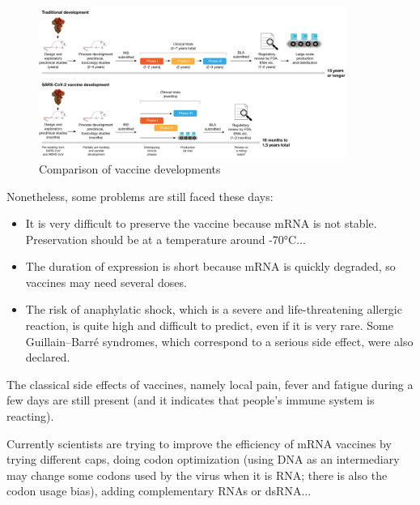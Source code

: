 \documentclass{article}
\begin{document}
            \begin{figure}
                \centering
                \includegraphics[width=0.9\textwidth]{imgs/CovidDev.png}
                \caption{Comparison of vaccine developments \autocite{krammerSARSCoV2VaccinesDevelopment2020}}
                \label{fig:devVaccine}
            \end{figure}

            Nonetheless, some problems are still faced these days:
            \begin{itemize}
                \item It is very difficult to preserve the vaccine because mRNA is not stable. 
                    Preservation should be at a temperature around -70°C...
                \item The duration of expression is short because mRNA is quickly degraded, 
                    so vaccines may need several doses.
                \item The risk of anaphylatic shock, which is a severe and life-threatening allergic reaction, is quite high and difficult to predict, even if it is very rare.
                        Some Guillain–Barré syndromes, which correspond to a serious side effect, were also declared.
            \end{itemize}
            The classical side effects of vaccines, namely local pain, fever and fatigue during a few days are still present
                 (and it indicates that people's immune system is reacting).
            
            Currently scientists are trying to improve the efficiency of mRNA vaccines by trying different caps,
            doing codon optimization (using DNA as an intermediary may change some codons used by the virus when it is RNA; there is also the codon usage bias),
            adding complementary RNAs or dsRNA... \autocite{MRNATransformativeTechnology}

\end{document}
